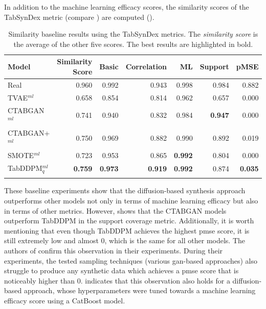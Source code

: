 In addition to the machine learning efficacy scores, the similarity scores of the TabSynDex metric (compare ) are computed ().

\begin{table}[h]
	\centering
	\begin{tabular}{lrrrrrr}
		\toprule
		\textbf{Model}     & \textbf{Similarity Score} & \textbf{Basic} & \textbf{Correlation} & \textbf{ML}    & \textbf{Support} & \textbf{pMSE}  \\
		\midrule
		Real               & 0.960                     & 0.992          & 0.943                & 0.998          & 0.984            & 0.882          \\
		TVAE$^{ml}$        & 0.658                     & 0.854          & 0.814                & 0.962          & 0.657            & 0.000          \\
		CTABGAN$^{ml}$     & 0.741                     & 0.940          & 0.832                & 0.984          & \textbf{0.947}   & 0.000          \\
		CTABGAN+$^{ml}$    & 0.750                     & 0.969          & 0.882                & 0.990          & 0.892            & 0.019          \\
		SMOTE$^{ml}$       & 0.723                     & 0.953          & 0.865                & \textbf{0.992} & 0.804            & 0.000          \\
		TabDDPM$^{ml}_{q}$ & \textbf{0.759}            & \textbf{0.973} & \textbf{0.919}       & \textbf{0.992} & 0.874            & \textbf{0.035} \\
		\bottomrule
		\multicolumn{7}{c}{}\\[-0.6em]
	\end{tabular}
	\caption[TabSynDex Baseline]{Similarity baseline results using the TabSynDex metrics. The \textit{similarity score} is the average of the other five scores. The best results are highlighted in bold.}
	\label{tab:sim_baseline}
\end{table}

These baseline experiments show that the diffusion-based synthesis approach outperforms other models not only in terms of machine learning efficacy but also in terms of other metrics.
However,  shows that the CTABGAN models outperform TabDDPM in the support coverage metric.
Additionally, it is worth mentioning that even though TabDDPM achieves the highest \gls{pmse} score, it is still extremely low and almost 0, which is the same for all other models.
The authors of \cite{chundawat2022UniversalMetricRobust} confirm this observation in their experiments.
During their experiments, the tested sampling techniques (various \gls{gan}-based approaches) also struggle to produce any synthetic data which achieves a \gls{pmse} score that is noticeably higher than 0.
 indicates that this observation also holds for a diffusion-based approach, whose hyperparameters were tuned towards a machine learning efficacy score using a CatBoost \gls{model}.

